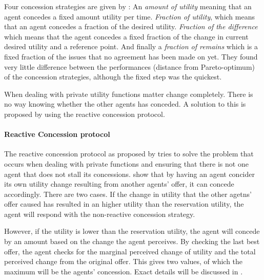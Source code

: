 Four concession strategies are given by \citet{wu2009efficient}: An \textit{amount of utility} meaning that an agent concedes a fixed amount utility per time. \textit{Fraction of utility}, which means that an agent concedes a fraction of the desired utility. \textit{Fraction of the difference} which means that the agent concedes a fixed fraction of the change in current desired utility and a reference point. And finally a \textit{fraction of remains} which is a fixed fraction of the issues that no agreement has been made on yet. They found very little difference between the performances (distance from Pareto-optimum) of the concession strategies, although the fixed step was the quickest. 

When dealing with private utility functions matter change completely. There is no way knowing whether the other agents has conceded. A solution to this is proposed by \citet{zheng2015automated} using the reactive concession protocol.

\paragraph{Reactive Concession protocol}
The reactive concession protocol as proposed by \citet{zheng2015automated} tries to solve the problem that occurs when dealing with private functions and ensuring that there is not one agent that does not stall its concessions. \citet{zheng2015automated} show that by having an agent concider its own utility change resulting from another agents' offer, it can concede accordingly. There are two cases. If the change in utility that the other agetns' offer caused has resulted in an higher utility than the reservation utility, the agent will respond with the non-reactive concession strategy. 

However, if the utility is lower than the reservation utility, the agent will concede by an amount based on the change the agent perceives. By checking the last best offer, the agent checks for the marginal perceived change of utility and the total perceived change from the original offer. This gives two values, of which the maximum will be the agents' concession. Exact details will be discussed in .


